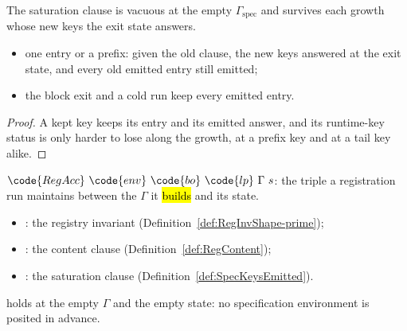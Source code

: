 \begin{lemma}
\label{lem:SpecKeysEmitted-append}
\leanok
{}
 The saturation clause is vacuous at the empty $\Gamma_{\mathrm{spec}}$ and survives each
growth whose new keys the exit state answers.
\begin{itemize}
\item one entry or a prefix: given the old clause, the new keys answered at the exit state, and every
old emitted entry still emitted;
\item the block exit and a cold  run keep every emitted entry.
\end{itemize}
\end{lemma}
\begin{proof}
\leanok
{}
 A kept key keeps its entry and its emitted answer, and its runtime-key status is only harder
to lose along the growth, at a prefix key and at a tail key alike.
\end{proof}
\begin{definition}
\label{def:RegAcc}
\leanok
{}
 $\code{RegAcc}\ \code{env}\ \code{bo}\ \code{lp}\ \Gamma\ s$: the triple a registration
run maintains between the $\Gamma$ it \hl{builds} and its state.
\begin{itemize}
\item {}: the registry invariant (Definition~\ref{def:RegInvShape-prime});
\item {}: the content clause (Definition~\ref{def:RegContent});
\item {}: the saturation clause (Definition~\ref{def:SpecKeysEmitted}).
\end{itemize}
\end{definition}
\begin{lemma}
\label{lem:RegAcc-coldStart}
\leanok
{}
  holds at the empty $\Gamma$ and the empty state: no specification
environment is posited in advance.
\end{lemma}
